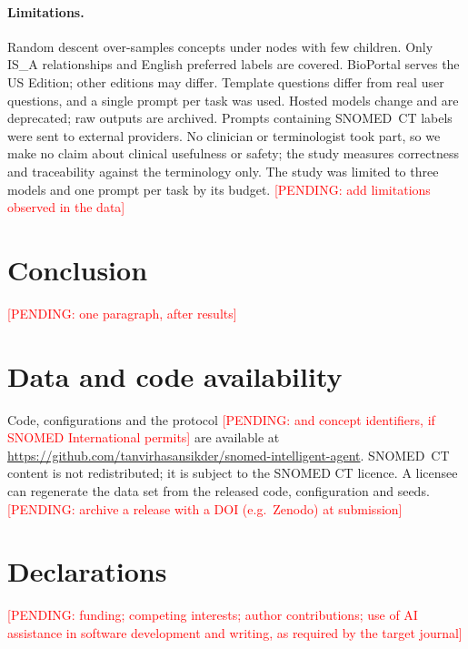 \documentclass[11pt]{article}
\newcommand{\pending}[1]{\textcolor{red}{[PENDING: #1]}}
\newcommand{\sct}{SNOMED~CT}
\begin{document}
\paragraph{Limitations.} Random descent over-samples concepts under nodes with few children. Only IS\_A relationships and English preferred labels are covered. BioPortal serves the US Edition; other editions may differ. Template questions differ from real user questions, and a single prompt per task was used. Hosted models change and are deprecated; raw outputs are archived. Prompts containing \sct{} labels were sent to external providers. No clinician or terminologist took part, so we make no claim about clinical usefulness or safety; the study measures correctness and traceability against the terminology only. The study was limited to three models and one prompt per task by its budget. \pending{add limitations observed in the data}

\section{Conclusion}
\pending{one paragraph, after results}

\section*{Data and code availability}
Code, configurations and the protocol \pending{and concept identifiers, if SNOMED International permits} are available at \url{https://github.com/tanvirhasansikder/snomed-intelligent-agent}. \sct{} content is not redistributed; it is subject to the SNOMED CT licence. A licensee can regenerate the data set from the released code, configuration and seeds. \pending{archive a release with a DOI (e.g.\ Zenodo) at submission}

\section*{Declarations}
\pending{funding; competing interests; author contributions; use of AI assistance in software development and writing, as required by the target journal}



\end{document}
